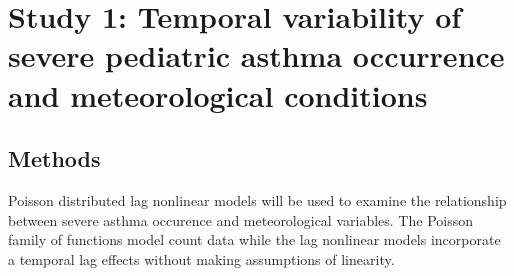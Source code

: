 
\section{Study 1: Temporal variability of severe pediatric asthma occurrence and meteorological conditions}





\subsection{Methods}


Poisson distributed lag nonlinear models will be used to examine the relationship between severe asthma occurence and meteorological variables.
The Poisson family of functions model count data while the lag nonlinear models incorporate a temporal lag effects without making assumptions of linearity.

